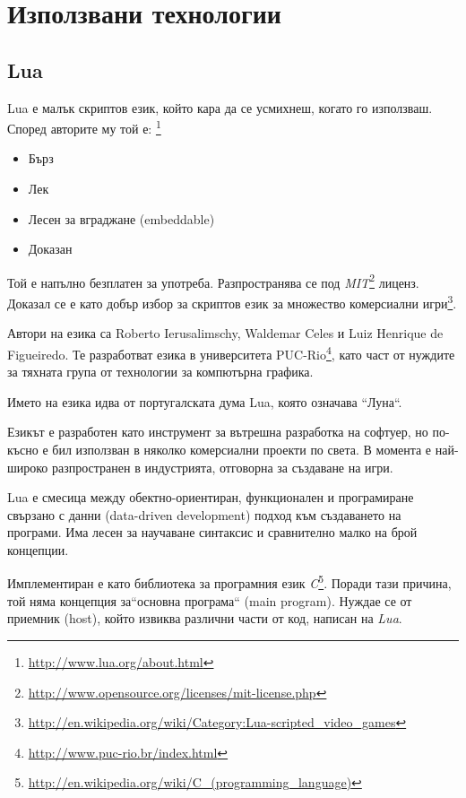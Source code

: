 \section{Използвани технологии}

	\subsection{Lua}
	
		Lua е малък скриптов език, който кара да се усмихнеш, когато го използваш. 
		Според авторите му той е: \footnote{\url{http://www.lua.org/about.html}} 
		
		\begin{itemize}			
			\item Бърз				
			\item Лек				
			\item Лесен за вграджане (embeddable)				
			\item Доказан				
		\end{itemize}
		
		Той е напълно безплатен за употреба. Разпространява се под 
		\emph{MIT}\footnote{\url{http://www.opensource.org/licenses/mit-license.php}} лиценз. 
		Доказал се е като добър избор за скриптов език за множество комерсиални 
		игри\footnote{\url{http://en.wikipedia.org/wiki/Category:Lua-scripted_video_games}}.
		
		Автори на езика са Roberto Ierusalimschy, Waldemar Celes и Luiz Henrique de Figueiredo. Те разработват езика в
		университета PUC-Rio\footnote{\url{http://www.puc-rio.br/index.html}}, като част от нуждите за тяхната група
		от технологии за компютърна графика. 
		
		Името на езика идва от португалската дума Lua, която означава ``Луна``.
		
		Езикът е разработен като инструмент за вътрешна разработка на софтуер, но по-късно е бил
		използван в няколко комерсиални проекти по света. В момента е най-широко разпространен в
		индустрията, отговорна за създаване на игри. \cite{Ierusalimschy}
		
		Lua е смесица между обектно-ориентиран, функционален и програмиране свързано с данни (data-driven development)
		подход към създаването на програми. Има лесен за научаване синтаксис и сравнително малко на брой концепции. 				
		
		Имплементиран е като библиотека за програмния език \emph{C}\footnote{\url{http://en.wikipedia.org/wiki/C_(programming_language)}}. 
		Поради тази причина, той няма концепция за``основна програма`` (main program). Нуждае се от приемник (host), който извиква различни
		части от код, написан на \emph{Lua}.
		
